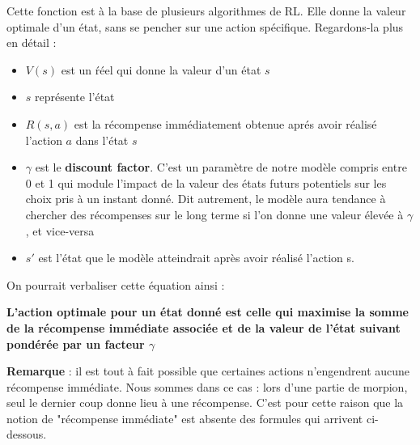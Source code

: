 \documentclass[french]{article}
\begin{document}
    Cette fonction est à la base de plusieurs algorithmes de RL. Elle donne la valeur optimale d'un état, sans se pencher sur une action spécifique. Regardons-la plus en détail :
    \begin{itemize}
        \item $V(s)$ est un ŕéel qui donne la valeur d'un état $s$
        \item $s$ représente l'état
        \item $R(s, a)$ est la récompense immédiatement obtenue aprés avoir réalisé l'action $a$ dans l'état $s$
        \item $\gamma$ est le \textbf{discount factor}. C'est un paramètre de notre modèle compris entre 0 et 1 qui module l'impact de la valeur des états futurs potentiels sur les choix pris à un instant donné. Dit autrement, le modèle aura tendance à chercher des récompenses sur le long terme si l'on donne une valeur élevée à $\gamma$, et vice-versa
        \item $s'$ est l'état que le modèle atteindrait après avoir réalisé l'action s.
    \end{itemize}
    On pourrait verbaliser cette équation ainsi :
    \begin{center} 
        {\textbf{L'action optimale pour un état donné est celle qui maximise la somme de la récompense immédiate associée et de la valeur de l'état suivant pondérée par un facteur $\gamma$}}
    \end{center}
    
    

    \textbf{Remarque} : il est tout à fait possible que certaines actions n'engendrent aucune récompense immédiate. Nous sommes dans ce cas : lors d'une partie de morpion, seul le dernier coup donne lieu à une récompense. C'est pour cette raison que la notion de "récompense immédiate" est absente des formules qui arrivent ci-dessous.
    
\end{document}
